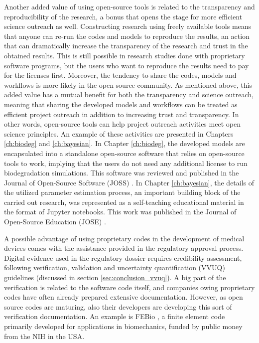 Another added value of using open-source tools is related to the transparency and reproducibility of the research, a bonus that opens the stage for more efficient science outreach as well. Constructing research using freely available tools means that anyone can re-run the codes and models to reproduce the results, an action that can dramatically increase the transparency of the research and trust in the obtained results. This is still possible in research studies done with proprietary software programs, but the users who want to reproduce the results need to pay for the licenses first. Moreover, the tendency to share the codes, models and workflows is more likely in the open-source community. As mentioned above, this added value has a mutual benefit for both the transparency and science outreach, meaning that sharing the developed models and workflows can be treated as efficient project outreach in addition to increasing trust and transparency. In other words, open-source tools can help project outreach activities meet open science principles. An example of these activities are presented in Chapters \ref{ch:biodeg} and \ref{ch:bayesian}. In Chapter \ref{ch:biodeg}, the developed models are encapsulated into a standalone open-source software that relies on open-source tools to work, implying that the users do not need any additional license to run biodegradation simulations. This software was reviewed and published in the Journal of Open-Source Software (JOSS) \cite{Barzegari2022JOSS}. In Chapter \ref{ch:bayesian}, the details of the utilized parameter estimation process, an important building block of the carried out research, was represented as a self-teaching educational material in the format of Jupyter notebooks. This work was published in the Journal of Open-Source Education (JOSE) \cite{Barzegari2021JOSE}.

A possible advantage of using proprietary codes in the development of medical devices comes with the assistance provided in the regulatory approval process. Digital evidence used in the regulatory dossier requires credibility assessment, following verification, validation and uncertainty quantification (\gls{VVUQ}) guidelines (discussed in section \ref{sec:conclusion_vvuq}).  A big part of the verification is related to the software code itself, and companies owing proprietary codes have often already prepared extensive documentation.  However, as open source codes are maturing, also their developers are developing this sort of verification documentation. An example is FEBio \cite{Maas2012}, a finite element code primarily developed for applications in biomechanics, funded by public money from the NIH in the USA.  

